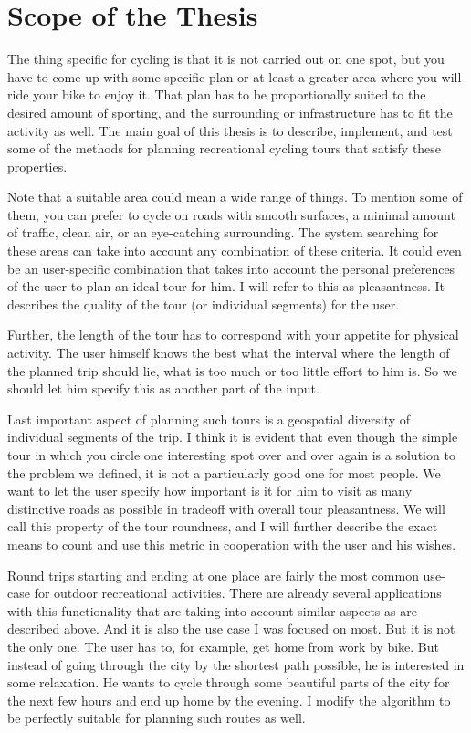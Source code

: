 \documentclass{ctuthesis}
\begin{document}
\section{Scope of the Thesis}
The thing specific for cycling is that it is not carried out on one spot, but you have to come up with some specific plan or at least a greater area where you will ride your bike to enjoy it. That plan has to be proportionally suited to the desired amount of sporting, and the surrounding or infrastructure has to fit the activity as well. The main goal of this thesis is to describe, implement, and test some of the methods for planning recreational cycling tours that satisfy these properties. \par   
Note that a suitable area could mean a wide range of things. To mention some of them, you can prefer to cycle on roads with smooth surfaces, a minimal amount of traffic, clean air, or an eye-catching surrounding. The system searching for these areas can take into account any combination of these criteria. It could even be an user-specific combination that takes into account the personal preferences of the user to plan an ideal tour for him. I will refer to this as pleasantness. It describes the quality of the tour (or individual segments) for the user. \par
Further, the length of the tour has to correspond with your appetite for physical activity. The user himself knows the best what the interval where the length of the planned trip should lie, what is too much or too little effort to him is. So we should let him specify this as another part of the input. \par 
Last important aspect of planning such tours is a geospatial diversity of individual segments of the trip. I think it is evident that even though the simple tour in which you circle one interesting spot over and over again is a solution to the problem we defined, it is not a particularly good one for most people. We want to let the user specify how important is it for him to visit as many distinctive roads as possible in tradeoff with overall tour pleasantness. We will call this property of the tour roundness, and I will further describe the exact means to count and use this metric in cooperation with the user and his wishes. \par
Round trips starting and ending at one place are fairly the most common use-case for outdoor recreational activities. There are already several applications with this functionality that are taking into account similar aspects as are described above. And it is also the use case I was focused on most. But it is not the only one. The user has to, for example, get home from work by bike. But instead of going through the city by the shortest path possible, he is interested in some relaxation. He wants to cycle through some beautiful parts of the city for the next few hours and end up home by the evening. I modify the algorithm to be perfectly suitable for planning such routes as well. \par
\end{document}
